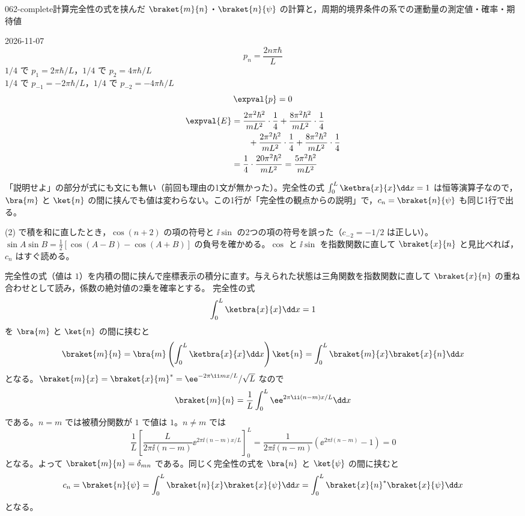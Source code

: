 \documentclass[uplatex,dvipdfmx,a4paper,11pt]{jsarticle}
\begin{document}
\begin{mondai}{062-complete}{計算}{完全性の式を挟んだ $\braket{m}{n}$・$\braket{n}{\psi}$ の計算と，周期的境界条件の系での運動量の測定値・確率・期待値}
\begin{kotaeutsushi}{2026-11-07}
\[ p_{n}=\frac{2n\pi\hbar}{L} \]
$1/4$ で $p_{1}=2\pi\hbar/L$，$1/4$ で $p_{2}=4\pi\hbar/L$\\
$1/4$ で $p_{-1}=-2\pi\hbar/L$，$1/4$ で $p_{-2}=-4\pi\hbar/L$
\[ \expval{p}=0 \]
\begin{align*}
\expval{E}&=\frac{2\pi^{2}\hbar^{2}}{mL^{2}}\cdot\frac{1}{4}+\frac{8\pi^{2}\hbar^{2}}{mL^{2}}\cdot\frac{1}{4}\\
&\qquad+\frac{2\pi^{2}\hbar^{2}}{mL^{2}}\cdot\frac{1}{4}+\frac{8\pi^{2}\hbar^{2}}{mL^{2}}\cdot\frac{1}{4}\\
&=\frac{1}{4}\cdot\frac{20\pi^{2}\hbar^{2}}{mL^{2}}=\frac{5\pi^{2}\hbar^{2}}{mL^{2}}
\end{align*}
\end{kotaeutsushi}
\begin{kizuki}
\item {} 「説明せよ」の部分が式にも文にも無い（前回も理由の1文が無かった）。完全性の式 $\int_{0}^{L}\ketbra{x}{x}\dd x=1$ は恒等演算子なので，$\bra{m}$ と $\ket{n}$ の間に挟んでも値は変わらない。この1行が「完全性の観点からの説明」で，$c_{n}=\braket{n}{\psi}$ も同じ1行で出る。
\item (2) で積を和に直したとき，$\cos(n+2)$ の項の符号と $\ii\sin$ の2つの項の符号を誤った（$c_{-2}=-1/2$ は正しい）。$\sin A\sin B=\frac{1}{2}[\cos(A-B)-\cos(A+B)]$ の負号を確かめる。$\cos$ と $\ii\sin$ を指数関数に直して $\braket{x}{n}$ と見比べれば，$c_{n}$ はすぐ読める。
\end{kizuki}
\begin{tadashii}
\houshin 完全性の式（値は $1$）を内積の間に挟んで座標表示の積分に直す。与えられた状態は三角関数を指数関数に直して $\braket{x}{n}$ の重ね合わせとして読み，係数の絶対値の2乗を確率とする。
\keisan {} 完全性の式
\[ \int_{0}^{L}\ketbra{x}{x}\dd x=1 \]
を $\bra{m}$ と $\ket{n}$ の間に挟むと
\[ \braket{m}{n}=\bra{m}\left(\int_{0}^{L}\ketbra{x}{x}\dd x\right)\ket{n}=\int_{0}^{L}\braket{m}{x}\braket{x}{n}\dd x \]
となる。$\braket{m}{x}=\braket{x}{m}^{*}=\ee^{-2\pi\ii mx/L}/\sqrt{L}$ なので
\[ \braket{m}{n}=\frac{1}{L}\int_{0}^{L}\ee^{2\pi\ii(n-m)x/L}\dd x \]
である。$n=m$ では被積分関数が $1$ で値は $1$。$n\neq m$ では
\[ \frac{1}{L}\left[\frac{L}{2\pi\ii(n-m)}\ee^{2\pi\ii(n-m)x/L}\right]_{0}^{L}=\frac{1}{2\pi\ii(n-m)}\left(\ee^{2\pi\ii(n-m)}-1\right)=0 \]
となる。よって $\braket{m}{n}=\delta_{mn}$ である。同じく完全性の式を $\bra{n}$ と $\ket{\psi}$ の間に挟むと
\[ c_{n}=\braket{n}{\psi}=\int_{0}^{L}\braket{n}{x}\braket{x}{\psi}\dd x=\int_{0}^{L}\braket{x}{n}^{*}\braket{x}{\psi}\dd x \]
となる。


\end{tadashii}
\end{mondai}
\end{document}
